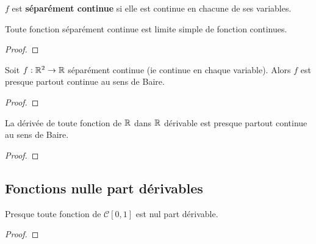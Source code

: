 \begin{definition}
	$f$ est \textbf{séparément continue} si elle est continue en chacune de ses
	variables.
\end{definition}

\begin{proposition}
	Toute fonction séparément continue est limite simple de fonction continues.
\end{proposition}

\begin{proof}
	
\end{proof}

\begin{corollary}
	Soit $f : \mathbb{R}^{2} \rightarrow \mathbb{R}$ séparément continue (ie continue en
	chaque variable). Alors $f$ est presque partout continue au sens de Baire.
\end{corollary}

\begin{proof}
	
\end{proof}

\begin{corollary}
	La dérivée de toute fonction de $\mathbb{R}$ dans $\mathbb{R}$ dérivable est presque
	partout continue au sens de Baire.
\end{corollary}

\begin{proof}
	
\end{proof}

\subsection{Fonctions nulle part dérivables}

\begin{theorem}
	Presque toute fonction de $\mathcal{C}[0, 1]$ est nul part dérivable.
\end{theorem}

\begin{proof}
	
\end{proof}
